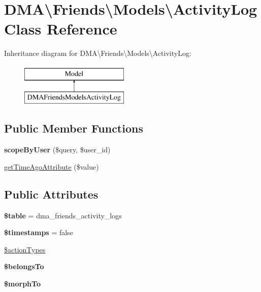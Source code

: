 \hypertarget{classDMA_1_1Friends_1_1Models_1_1ActivityLog}{}\section{D\+M\+A\textbackslash{}Friends\textbackslash{}Models\textbackslash{}Activity\+Log Class Reference}
\label{classDMA_1_1Friends_1_1Models_1_1ActivityLog}
Inheritance diagram for D\+M\+A\textbackslash{}Friends\textbackslash{}Models\textbackslash{}Activity\+Log\+:\begin{figure}[H]
\begin{center}
\leavevmode
\includegraphics[height=2.000000cm]{d8/ddf/classDMA_1_1Friends_1_1Models_1_1ActivityLog}
\end{center}
\end{figure}
\subsection*{Public Member Functions}
\begin{DoxyCompactItemize}
\item 
\hypertarget{classDMA_1_1Friends_1_1Models_1_1ActivityLog_afee4eb22dd72600db4819f1924323610}{}{\bfseries scope\+By\+User} (\$query, \$user\+\_\+id)\label{classDMA_1_1Friends_1_1Models_1_1ActivityLog_afee4eb22dd72600db4819f1924323610}

\item 
\hyperlink{classDMA_1_1Friends_1_1Models_1_1ActivityLog_aa9eef6535dca7db82fa2be959a76efb1}{get\+Time\+Ago\+Attribute} (\$value)
\end{DoxyCompactItemize}
\subsection*{Public Attributes}
\begin{DoxyCompactItemize}
\item 
\hypertarget{classDMA_1_1Friends_1_1Models_1_1ActivityLog_a231d21bb93f9c0079c3f5cf51369d0c1}{}{\bfseries \$table} = \textquotesingle{}dma\+\_\+friends\+\_\+activity\+\_\+logs\textquotesingle{}\label{classDMA_1_1Friends_1_1Models_1_1ActivityLog_a231d21bb93f9c0079c3f5cf51369d0c1}

\item 
\hypertarget{classDMA_1_1Friends_1_1Models_1_1ActivityLog_a11055e835c6bf48f58e019267dd469a2}{}{\bfseries \$timestamps} = false\label{classDMA_1_1Friends_1_1Models_1_1ActivityLog_a11055e835c6bf48f58e019267dd469a2}

\item 
\hyperlink{classDMA_1_1Friends_1_1Models_1_1ActivityLog_aa60b5fe0e1e7c254827bfa35c69aef9d}{\$action\+Types}
\item 
{\bfseries \$belongs\+To}
\item 
{\bfseries \$morph\+To}
\end{DoxyCompactItemize}
